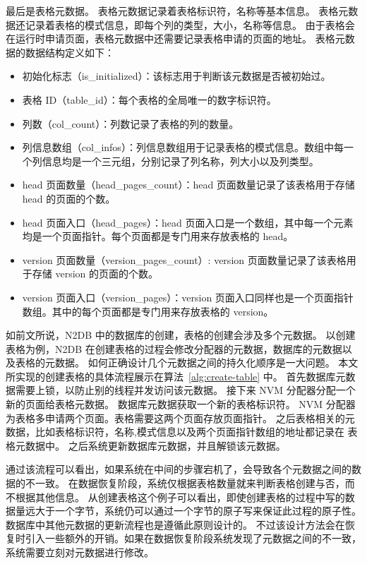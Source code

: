 最后是表格元数据。
表格元数据记录着表格标识符，名称等基本信息。
表格元数据还记录着表格的模式信息，即每个列的类型，大小，名称等信息。
由于表格会在运行时申请页面，表格元数据中还需要记录表格申请的页面的地址。
表格元数据的数据结构定义如下：
\begin{itemize}
    \item 初始化标志（is\_initialized）：该标志用于判断该元数据是否被初始过。
    \item 表格 ID（table\_id）：每个表格的全局唯一的数字标识符。
    \item 列数（col\_count）：列数记录了表格的列的数量。
    \item 列信息数组（col\_infos）：列信息数组用于记录表格的模式信息。数组中每一个列信息均是一个三元组，分别记录了列名称，列大小以及列类型。
    \item head 页面数量（head\_pages\_count）：head 页面数量记录了该表格用于存储 head 的页面的个数。
    \item head 页面入口（head\_pages）：head 页面入口是一个数组，其中每一个元素均是一个页面指针。每个页面都是专门用来存放表格的 head。
    \item version 页面数量（version\_pages\_count）: version 页面数量记录了该表格用于存储 version 的页面的个数。
    \item version 页面入口（version\_pages）：version 页面入口同样也是一个页面指针数组。其中的每个页面都是专门用来存放表格的 version。
\end{itemize}


如前文所说，N2DB 中的数据库的创建，表格的创建会涉及多个元数据。
以创建表格为例，N2DB 在创建表格的过程会修改分配器的元数据，数据库的元数据以及表格的元数据。
如何正确设计几个元数据之间的持久化顺序是一大问题。
本文所实现的创建表格的具体流程展示在算法~\ref{alg:create-table} 中。
首先数据库元数据需要上锁，以防止别的线程并发访问该元数据。
接下来 NVM 分配器分配一个新的页面给表格元数据。
数据库元数据获取一个新的表格标识符。
NVM 分配器为表格多申请两个页面。表格需要这两个页面存放页面指针。
之后表格相关的元数据，比如表格标识符，名称,模式信息以及两个页面指针数组的地址都记录在 表格元数据中。
之后系统更新数据库元数据，并且解锁该元数据。

通过该流程可以看出，如果系统在中间的步骤宕机了，会导致各个元数据之间的数据的不一致。
在数据恢复阶段，系统仅根据表格数量就来判断表格创建与否，而不根据其他信息。
从创建表格这个例子可以看出，即使创建表格的过程中写的数据量远大于一个字节，系统仍可以通过一个字节的原子写来保证此过程的原子性。数据库中其他元数据的更新流程也是遵循此原则设计的。
不过该设计方法会在恢复时引入一些额外的开销。如果在数据恢复阶段系统发现了元数据之间的不一致，系统需要立刻对元数据进行修改。

